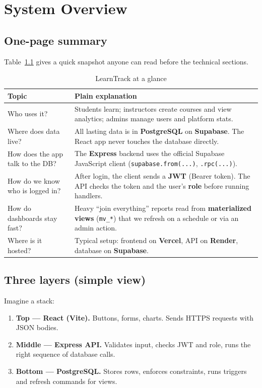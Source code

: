 
\chapter{System Overview}
\label{ch:overview}

\section{One-page summary}
Table~\ref{tab:onepage} gives a quick snapshot anyone can read before the technical sections.

\begin{table}[htbp]
\centering
\caption{LearnTrack at a glance}
\label{tab:onepage}
\begin{tabular}{@{}p{3.2cm}p{9.6cm}@{}}
\toprule
\textbf{Topic} & \textbf{Plain explanation} \\
\midrule
Who uses it? & Students learn; instructors create courses and view analytics; admins manage users and platform stats. \\
Where does data live? & All lasting data is in \textbf{PostgreSQL} on \textbf{Supabase}. The React app never touches the database directly. \\
How does the app talk to the DB? & The \textbf{Express} backend uses the official Supabase JavaScript client (\texttt{supabase.from(...)}, \texttt{.rpc(...)}). \\
How do we know who is logged in? & After login, the client sends a \textbf{JWT} (Bearer token). The API checks the token and the user's \textbf{role} before running handlers. \\
How do dashboards stay fast? & Heavy ``join everything'' reports read from \textbf{materialized views} (\texttt{mv\_*}) that we refresh on a schedule or via an admin action. \\
Where is it hosted? & Typical setup: frontend on \textbf{Vercel}, API on \textbf{Render}, database on \textbf{Supabase}. \\
\bottomrule
\end{tabular}
\end{table}

\section{Three layers (simple view)}
Imagine a stack:

\begin{enumerate}[leftmargin=*]
  \item \textbf{Top — React (Vite).} Buttons, forms, charts. Sends HTTPS requests with JSON bodies.
  \item \textbf{Middle — Express API.} Validates input, checks JWT and role, runs the right sequence of database calls.
  \item \textbf{Bottom — PostgreSQL.} Stores rows, enforces constraints, runs triggers and refresh commands for views.
\end{enumerate}

